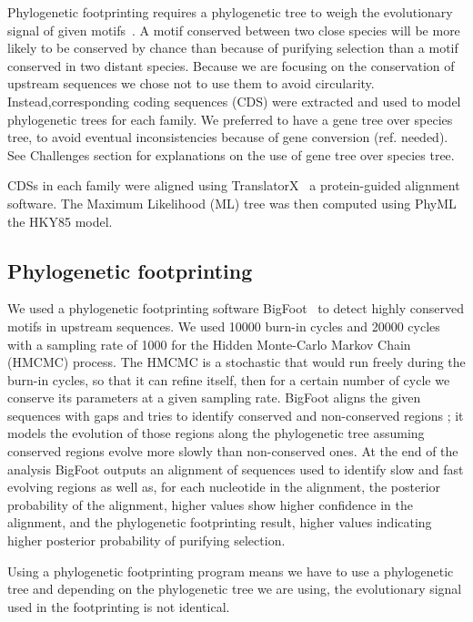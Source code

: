 Phylogenetic footprinting requires a phylogenetic tree to weigh the evolutionary signal of given motifs~\citep{zhang_mice_2003}. A motif conserved between two close species will be more likely to be conserved by chance than because of purifying selection than a motif conserved in two distant species. Because we are focusing on the conservation of upstream sequences we chose not to use them to avoid circularity. Instead,corresponding coding sequences (CDS) were extracted and used to model phylogenetic trees for each family. We preferred to have a gene tree over species tree, to avoid eventual inconsistencies because of gene conversion (ref. needed). See Challenges section for explanations on the use of gene tree over species tree.

CDSs in each family were aligned using TranslatorX~\citep{abascal_translatorx:_2010} a protein-guided alignment software. The Maximum Likelihood (ML) tree was then computed using PhyML~\citep{guindon_new_2010} the HKY85 model.

\subsection*{Phylogenetic footprinting}

We used a phylogenetic footprinting software BigFoot~\citep{satija_bigfoot:_2009} to detect highly conserved motifs in upstream sequences. We used 10000 burn-in cycles and 20000 cycles with a sampling rate of 1000 for the Hidden Monte-Carlo Markov Chain (HMCMC) process. The HMCMC is a stochastic that would run freely during the burn-in cycles, so that it can refine itself, then for a certain number of cycle we conserve its parameters at a given sampling rate. BigFoot aligns the given sequences with gaps and tries to identify conserved and non-conserved regions ; it models the evolution of those regions along the phylogenetic tree assuming conserved regions evolve more slowly than non-conserved ones. At the end of the analysis BigFoot outputs an alignment of sequences used to identify slow and fast evolving regions as well as, for each nucleotide in the alignment, the posterior probability of the alignment, higher values show higher confidence in the alignment, and the phylogenetic footprinting result, higher values indicating higher posterior probability of purifying selection.

Using a phylogenetic footprinting program means we have to use a phylogenetic tree and depending on the phylogenetic tree we are using, the evolutionary signal used in the footprinting is not identical.

